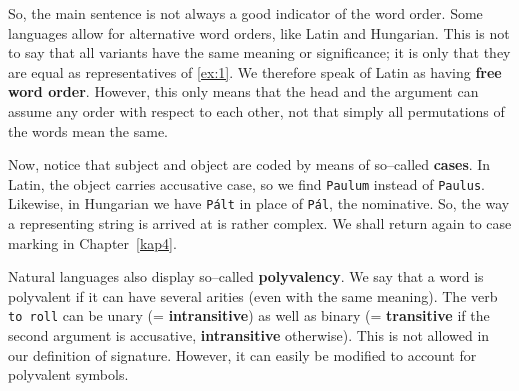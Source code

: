 So, the main sentence is not always a good indicator of the
word order. Some languages allow for alternative word orders,
like Latin and Hungarian. This is not to say that all variants
have the same meaning or significance; it is only that they
are equal as representatives of \eqref{ex:1}. We therefore
speak of Latin as having \textbf{free word order}.
However, this only means that the head and the argument can
assume any order with respect to each other, not that simply
all permutations of the words mean the same.

Now, notice that subject and object are coded by means
of so--called \textbf{cases}. In Latin, the object carries accusative
case, so we find {\tt Paulum} instead of {\tt Paulus}. Likewise,
in Hungarian we have {\tt P\'alt} in place of {\tt P\'al},
the nominative. So, the way a representing string is arrived at
is rather complex.  We shall return again to case marking in
Chapter~\ref{kap4}.

Natural languages also display so--called
\textbf{polyvalency}. We say that a word is polyvalent if it can have
several arities (even with the same meaning). The verb {\tt to roll}
can be unary (= \textbf{intransitive}) as well as binary 
(= \textbf{transitive} if the second argument is accusative, 
\textbf{intransitive} otherwise).
This is not allowed in our definition of signature. However,
it can easily be modified to account for polyvalent symbols.

